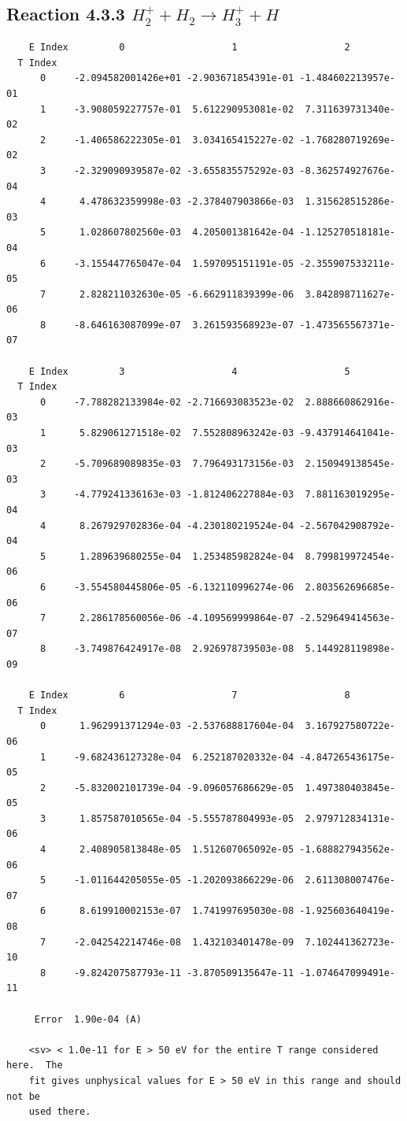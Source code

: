 \documentclass[12pt,dvipdfmx]{article}
\begin{document}
\newpage
\subsection{
Reaction 4.3.3 $   H_2^+ + H_2 \rightarrow H_3^+ + H$}


\begin{small}\begin{verbatim}
    E Index         0                   1                   2
  T Index
      0     -2.094582001426e+01 -2.903671854391e-01 -1.484602213957e-01
      1     -3.908059227757e-01  5.612290953081e-02  7.311639731340e-02
      2     -1.406586222305e-01  3.034165415227e-02 -1.768280719269e-02
      3     -2.329090939587e-02 -3.655835575292e-03 -8.362574927676e-04
      4      4.478632359998e-03 -2.378407903866e-03  1.315628515286e-03
      5      1.028607802560e-03  4.205001381642e-04 -1.125270518181e-04
      6     -3.155447765047e-04  1.597095151191e-05 -2.355907533211e-05
      7      2.828211032630e-05 -6.662911839399e-06  3.842898711627e-06
      8     -8.646163087099e-07  3.261593568923e-07 -1.473565567371e-07

    E Index         3                   4                   5
  T Index
      0     -7.788282133984e-02 -2.716693083523e-02  2.888660862916e-03
      1      5.829061271518e-02  7.552808963242e-03 -9.437914641041e-03
      2     -5.709689089835e-03  7.796493173156e-03  2.150949138545e-03
      3     -4.779241336163e-03 -1.812406227884e-03  7.881163019295e-04
      4      8.267929702836e-04 -4.230180219524e-04 -2.567042908792e-04
      5      1.289639680255e-04  1.253485982824e-04  8.799819972454e-06
      6     -3.554580445806e-05 -6.132110996274e-06  2.803562696685e-06
      7      2.286178560056e-06 -4.109569999864e-07 -2.529649414563e-07
      8     -3.749876424917e-08  2.926978739503e-08  5.144928119898e-09

    E Index         6                   7                   8
  T Index
      0      1.962991371294e-03 -2.537688817604e-04  3.167927580722e-06
      1     -9.682436127328e-04  6.252187020332e-04 -4.847265436175e-05
      2     -5.832002101739e-04 -9.096057686629e-05  1.497380403845e-05
      3      1.857587010565e-04 -5.555787804993e-05  2.979712834131e-06
      4      2.408905813848e-05  1.512607065092e-05 -1.688827943562e-06
      5     -1.011644205055e-05 -1.202093866229e-06  2.611308007476e-07
      6      8.619910002153e-07  1.741997695030e-08 -1.925603640419e-08
      7     -2.042542214746e-08  1.432103401478e-09  7.102441362723e-10
      8     -9.824207587793e-11 -3.870509135647e-11 -1.074647099491e-11

     Error  1.90e-04 (A)

    <sv> < 1.0e-11 for E > 50 eV for the entire T range considered here.  The
    fit gives unphysical values for E > 50 eV in this range and should not be
    used there.
\end{verbatim}\end{small}
\end{document}

